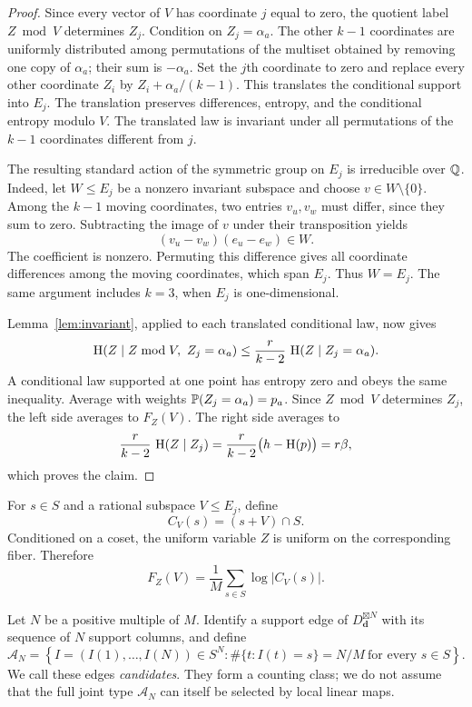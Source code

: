 \begin{proof}
Since every vector of $V$ has coordinate $j$ equal to zero, the quotient
label $Z\bmod V$ determines $Z_j$.  Condition on $Z_j=\alpha_a$.
The other $k-1$ coordinates are uniformly distributed among permutations
of the multiset obtained by removing one copy of $\alpha_a$; their sum
is $-\alpha_a$.  Set the $j$th coordinate to zero and replace every
other coordinate $Z_i$ by $Z_i+\alpha_a/(k-1)$.  This translates the
conditional support into $E_j$.  The translation preserves differences,
entropy, and the conditional entropy modulo $V$.  The translated law
is invariant under all permutations of the $k-1$ coordinates different
from $j$.

The resulting standard action of the symmetric group on $E_j$ is
irreducible over $\mathbb Q$.  Indeed, let $W\leq E_j$ be a nonzero invariant
subspace and choose $v\in W\setminus\{0\}$.  Among the $k-1$ moving
coordinates, two entries $v_u,v_w$ must differ, since they sum to zero.
Subtracting the image of $v$ under their transposition yields
\[
  (v_u-v_w)(e_u-e_w)\in W.
\]
The coefficient is nonzero.  Permuting this difference gives all
coordinate differences among the moving coordinates, which span $E_j$.
Thus $W=E_j$.  The same argument includes $k=3$, when $E_j$ is
one-dimensional.

Lemma~\ref{lem:invariant}, applied to each translated conditional law,
now gives
\[
  \operatorname{H}(Z\mid Z\bmod V,\ Z_j=\alpha_a)
  \leq\frac{r}{k-2}\,\operatorname{H}(Z\mid Z_j=\alpha_a).
\]
A conditional law supported at one point has entropy zero and obeys the
same inequality.  Average with weights
$\mathbb P(Z_j=\alpha_a)=p_a$.  Since $Z\bmod V$ determines $Z_j$, the left
side averages to $F_Z(V)$.  The right side averages to
\[
  \frac{r}{k-2}\,\operatorname{H}(Z\mid Z_j)
  =\frac{r}{k-2}\bigl(h-\operatorname{H}(p)\bigr)
  =r\beta,
\]
which proves the claim.
\end{proof}

For $s\in S$ and a rational subspace $V\leq E_j$, define
\[
  C_V(s)=(s+V)\cap S.
\]
Conditioned on a coset, the uniform variable $Z$ is uniform on the
corresponding fiber.  Therefore
\begin{equation}
  F_Z(V)=\frac{1}{M}\sum_{s\in S}\log |C_V(s)|.
  \label{eq:fiber-entropy-identity}
\end{equation}

Let $N$ be a positive multiple of $M$.  Identify a support edge of
$D_{\mathbf d}^{\boxtimes N}$ with its sequence of $N$ support columns,
and define
\[
  \mathcal A_N=
  \left\{I=(I(1),\ldots,I(N))\in S^N:
    \#\{t:I(t)=s\}=N/M\ \text{for every }s\in S\right\}.
\]
We call these edges \emph{candidates}.  They form a counting class;
we do not assume that the full joint type $\mathcal A_N$ can itself be
selected by local linear maps.

